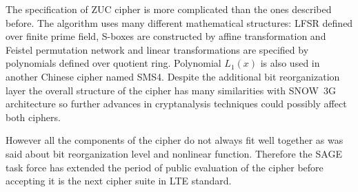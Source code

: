 The specification of ZUC cipher is more complicated than the ones described
before. The algorithm uses many different mathematical structures: LFSR defined
over finite prime field, S-boxes are constructed by affine transformation and
Feistel permutation network and linear transformations are specified by
polynomials defined over quotient ring. Polynomial $L_1(x)$ is also used in
another Chinese cipher named SMS4. Despite the additional bit reorganization
layer the overall structure of the cipher has many similarities with SNOW~3G
architecture so further advances in cryptanalysis techniques could possibly
affect both ciphers.

However all the components of the cipher do not always fit well together as was
said about bit reorganization level and nonlinear function. Therefore the SAGE
task force has extended the period of public evaluation of the cipher before
accepting it is the next cipher suite in LTE standard. 

